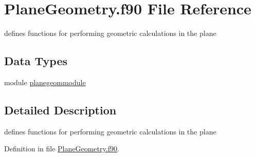 \hypertarget{PlaneGeometry_8f90}{\section{Plane\+Geometry.\+f90 File Reference}
\label{PlaneGeometry_8f90}
}


defines functions for performing geometric calculations in the plane  


\subsection*{Data Types}
\begin{DoxyCompactItemize}
\item 
module \hyperlink{classplanegeommodule}{planegeommodule}
\end{DoxyCompactItemize}


\subsection{Detailed Description}
defines functions for performing geometric calculations in the plane 



Definition in file \hyperlink{PlaneGeometry_8f90_source}{Plane\+Geometry.\+f90}.

